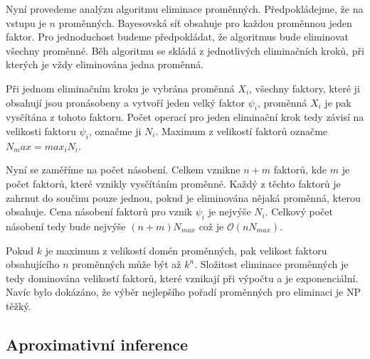 Nyní provedeme analýzu algoritmu eliminace proměnných.
Předpokládejme, že na vstupu je $n$ proměnných.
Bayesovská síť obsahuje pro každou proměnnou jeden faktor.
Pro jednoduchost budeme předpokládat, že algoritmus bude eliminovat všechny proměnné.
Běh algoritmu se skládá z jednotlivých eliminačních kroků, při kterých je vždy eliminována jedna proměnná.

Při jednom eliminačním kroku je vybrána proměnná $X_i$, všechny faktory, které ji obsahují jsou pronásobeny a vytvoří jeden velký faktor $\psi_i$, proměnná $X_i$ je pak vysčítána z tohoto faktoru.
Počet operací pro jeden eliminační krok tedy závisí na velikosti faktoru $\psi_i$, označme ji $N_i$.
Maximum z velikostí faktorů označme $N_max = max_i N_i$.

Nyní se zaměříme na počet násobení.
Celkem vznikne $n+m$ faktorů, kde $m$ je počet faktorů, které vznikly vysčítáním proměnné.
Každý z těchto faktorů je zahrnut do součinu pouze jednou, pokud je eliminována nějaká proměnná, kterou obsahuje.
Cena násobení faktorů pro vznik $\psi_i$ je nejvýše $N_i$.
Celkový počet násobení tedy bude nejvýše $(n+m)N_{max}$ což je $\mathcal{O}(nN_{max})$.

Pokud $k$ je maximum z velikostí domén proměnných, pak velikost faktoru obsahujícího $n$ proměnných může být až $k^n$.
Složitost eliminace proměnných je tedy dominována velikostí faktorů, které vznikají při výpočtu a je exponenciální.
Navíc bylo dokázáno, že výběr nejlepšího pořadí proměnných pro eliminaci je NP těžký.

\subsection{Aproximativní inference}
